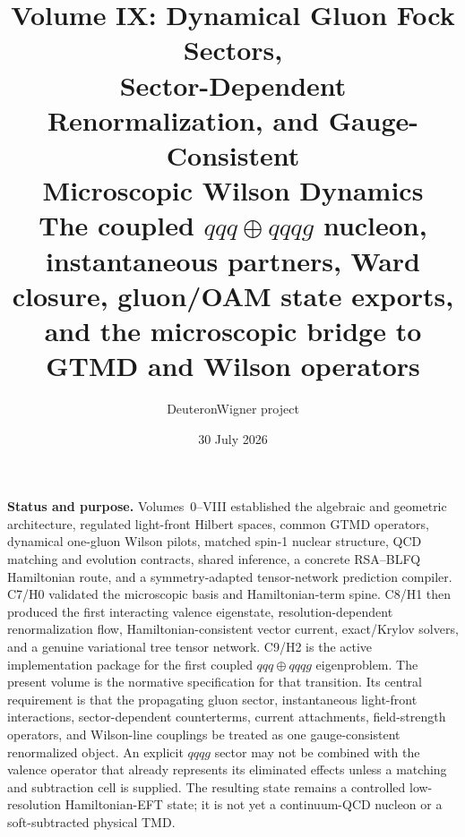 \documentclass[11pt]{article}
\title{\vspace{-1.0cm}
{\color{navy}\bfseries Volume IX: Dynamical Gluon Fock Sectors,\\[2mm]
Sector-Dependent Renormalization, and Gauge-Consistent\\[1mm]
Microscopic Wilson Dynamics}\\[4mm]
\large The coupled \(qqq\oplus qqqg\) nucleon, instantaneous partners, Ward closure,
gluon/OAM state exports, and the microscopic bridge to GTMD and Wilson operators}
\author{DeuteronWigner project}
\date{30 July 2026}
\begin{document}
\maketitle

\begin{center}
\begin{minipage}{0.94\textwidth}
\colorbox{softblue}{\parbox{0.96\textwidth}{
\textbf{Status and purpose.}
Volumes~0--VIII established the algebraic and geometric architecture, regulated
light-front Hilbert spaces, common GTMD operators, dynamical one-gluon Wilson
pilots, matched spin-1 nuclear structure, QCD matching and evolution contracts,
shared inference, a concrete RSA--BLFQ Hamiltonian route, and a
symmetry-adapted tensor-network prediction compiler.  C7/H0 validated the
microscopic basis and Hamiltonian-term spine.  C8/H1 then produced the first
interacting valence eigenstate, resolution-dependent renormalization flow,
Hamiltonian-consistent vector current, exact/Krylov solvers, and a genuine
variational tree tensor network.  C9/H2 is the active implementation package
for the first coupled \(qqq\oplus qqqg\) eigenproblem.  The present volume is
the normative specification for that transition.  Its central requirement is
that the propagating gluon sector, instantaneous light-front interactions,
sector-dependent counterterms, current attachments, field-strength operators,
and Wilson-line couplings be treated as one gauge-consistent renormalized
object.  An explicit \(qqqg\) sector may not be combined with the valence
operator that already represents its eliminated effects unless a matching and
subtraction cell is supplied.  The resulting state remains a controlled
low-resolution Hamiltonian-EFT state; it is not yet a continuum-QCD nucleon or
a soft-subtracted physical TMD.
}}
\end{minipage}
\end{center}
\end{document}
